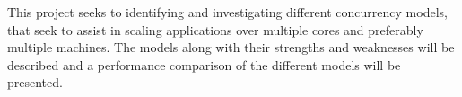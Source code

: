 This project seeks to identifying and investigating different concurrency models, that seek to assist in scaling applications over multiple cores and preferably multiple machines. The models along with their strengths and weaknesses will be described and a performance comparison of the different models will be presented.



 
\worksheetend

